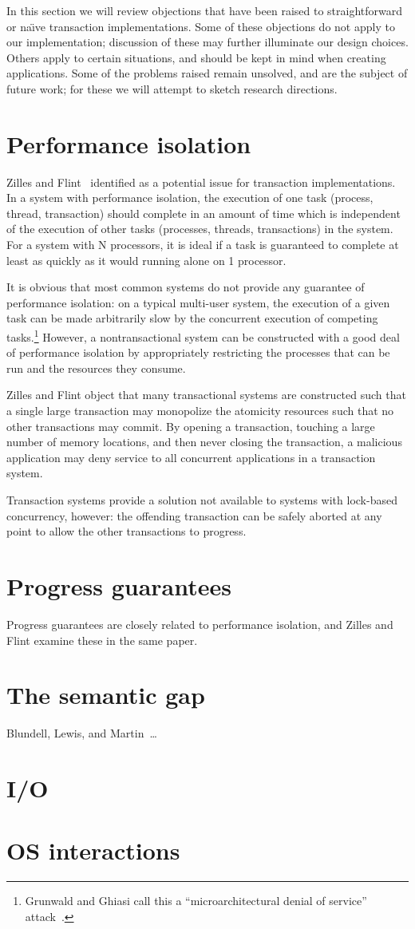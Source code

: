 In this section we will review objections that have been raised to
straightforward or na{\"\i}ve transaction implementations.
Some of these objections do not apply to our implementation;
discussion of these may further illuminate our design choices.
Others apply to certain situations, and should be kept in mind when
creating applications.  Some of the problems raised remain unsolved,
and are the subject of future work; for these we will attempt to sketch
research directions.

\section{Performance isolation}
Zilles and Flint~\cite{ZillesFl05} identified
 as a potential issue for
transaction implementations.  In a system with performance isolation,
the execution of one task (process, thread, transaction) should
complete in an amount of time which is independent of the execution of
other tasks (processes, threads, transactions) in the system.  For
a system with N processors, it is ideal if a task is guaranteed to
complete at least as quickly as it would running alone on 1
processor.

It is obvious that most common systems do not provide any guarantee of
performance isolation: on a typical multi-user system, the execution
of a given task can be made arbitrarily slow by the concurrent
execution of competing tasks.\footnote{Grunwald and Ghiasi call this a
``microarchitectural denial of service'' attack~\cite{GrunwaldGh02}.}
However, a nontransactional system can
be constructed with a good deal of performance isolation by
appropriately restricting the processes that can be run and the
resources they consume.

Zilles and Flint object that many transactional systems are
constructed such that a single large transaction may monopolize the
atomicity resources such that no other transactions may commit.  By
opening a transaction, touching a large number of memory locations,
and then never closing the transaction, a malicious application may
deny service to all concurrent applications in a transaction system.

Transaction systems provide a solution not available to systems with
lock-based concurrency, however: the offending transaction can be
safely aborted at any point to allow the other transactions to
progress.

\section{Progress guarantees}\label{sec:progress}
Progress guarantees are closely related to performance isolation, and
Zilles and Flint examine these in the same paper.

\section{The semantic gap}\label{sec:semantic}
Blundell, Lewis, and Martin~\cite{BlundellLeMa05}\ldots

\section{I/O}
\section{OS interactions}
